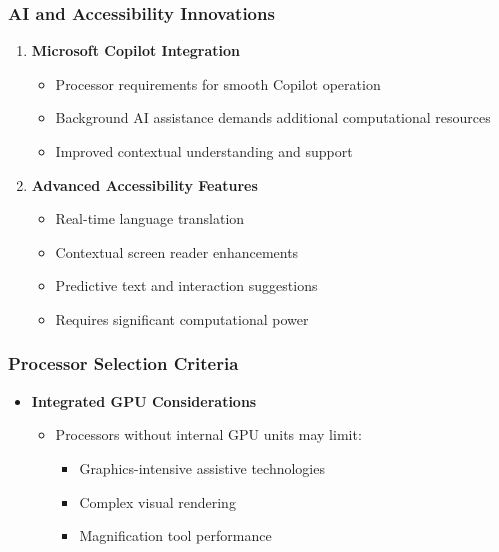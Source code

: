 \subsubsection{AI and Accessibility Innovations}

\begin{enumerate}
\item \textbf{Microsoft Copilot Integration}

\begin{itemize}
\item Processor requirements for smooth Copilot operation \cite{MicrosoftCopilotRequirements}
\item Background AI assistance demands additional computational resources \cite{MicrosoftCopilotTech}
\item Improved contextual understanding and support \cite{MicrosoftCopilotFeatures}
\end{itemize}

\item \textbf{Advanced Accessibility Features}

\begin{itemize}
\item Real-time language translation \cite{GoogleTranslateRealtime}
\item Contextual screen reader enhancements \cite{AIinAccessibility}
\item Predictive text and interaction suggestions \cite{PredictiveTextAccessibility}
\item Requires significant computational power \cite{AIComputationalRequirements}
\end{itemize}

\end{enumerate}



\subsubsection{Processor Selection Criteria}

\begin{itemize}
\item \textbf{Integrated GPU Considerations}

\begin{itemize}
\item Processors without internal GPU units may limit:

\begin{itemize}
\item Graphics-intensive assistive technologies \cite{GPUforAssistiveTech}
\item Complex visual rendering \cite{GPUforAssistiveTech}
\item Magnification tool performance \cite{GPUforAssistiveTech}
\end{itemize}

\end{itemize}

\end{itemize}

